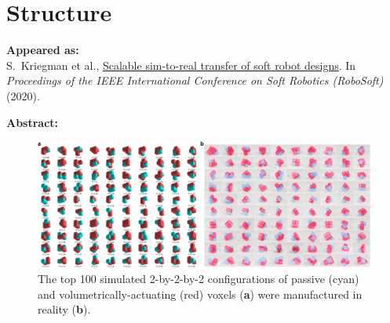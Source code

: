 \chapter{Structure}

\textbf{Appeared as:}\\
S.~Kriegman et al.,
\href{https://ieeexplore.ieee.org/abstract/document/9116004}{\color{blue}Scalable sim-to-real transfer of soft robot designs}.
In
\textit{Proceedings of the IEEE International Conference on Soft Robotics (RoboSoft)} (2020).


\vspace{1em}

\noindent
\textbf{Abstract:}\\



\begin{figure}[t]
    \centering
    \includegraphics[width=\linewidth]{Chapter02/fig/roboSoftTeaser.png}
    \caption{The top 100 simulated 2-by-2-by-2 configurations of passive (cyan) and volumetrically-actuating (red) voxels (\textbf{a}) were manufactured in reality (\textbf{b}).
    } 
    \label{fig:teaser}
\end{figure}













